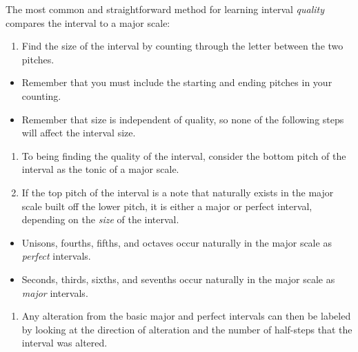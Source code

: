 \documentclass{book}
\providecommand{\tightlist}{%
  \setlength{\itemsep}{0pt}\setlength{\parskip}{0pt}}
\begin{document}
The most common and straightforward method for learning interval
\emph{quality} compares the interval to a major scale:

\begin{enumerate}
\def\labelenumi{\arabic{enumi}.}
\tightlist
\item
  Find the size of the interval by counting through the letter between the two
  pitches.
\end{enumerate}

\begin{itemize}
\tightlist
\item
  Remember that you must include the starting and ending pitches in your
  counting.
\item
  Remember that size is independent of quality, so none of the following steps
  will affect the interval size.
\end{itemize}

\begin{enumerate}
\def\labelenumi{\arabic{enumi}.}
\tightlist
\item
  To being finding the quality of the interval, consider the bottom pitch of
  the interval as the tonic of a major scale.
\item
  If the top pitch of the interval is a note that naturally exists in the
  major scale built off the lower pitch, it is either a major or perfect
  interval, depending on the \emph{size} of the interval.
\end{enumerate}

\begin{itemize}
\tightlist
\item
  Unisons, fourths, fifths, and octaves occur naturally in the major scale as
  \emph{perfect} intervals.
\item
  Seconds, thirds, sixths, and sevenths occur naturally in the major scale as
  \emph{major} intervals.
\end{itemize}

\begin{enumerate}
\def\labelenumi{\arabic{enumi}.}
\tightlist
\item
  Any alteration from the basic major and perfect intervals can then be
  labeled by looking at the direction of alteration and the number of
  half-steps that the interval was altered.
\end{enumerate}
\end{document}
